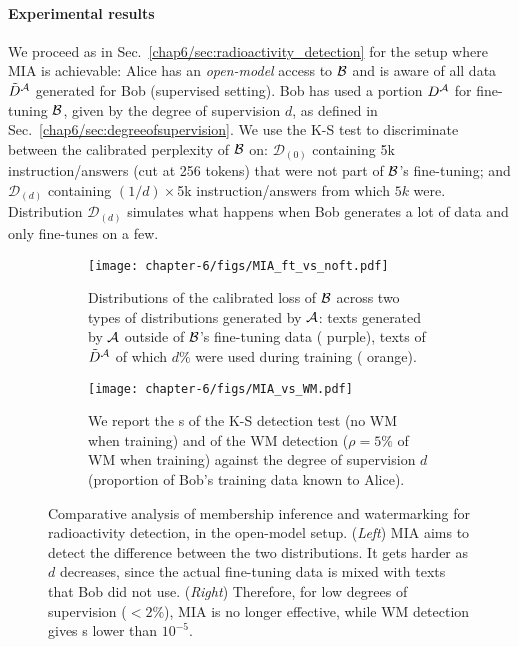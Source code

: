 \paragraph*{Experimental results}

We proceed as in Sec.~\ref{chap6/sec:radioactivity_detection} for the setup where MIA is achievable:
Alice has an \emph{open-model} access to $\mathcal B$ and is aware of all data $\Tilde{D}^\mathcal A$ generated for Bob (supervised setting). 
Bob has used a portion $D^\mathcal A$ for fine-tuning $\mathcal B$, given by the degree of supervision $d$, as defined in Sec.~\ref{chap6/sec:degreeofsupervision}.
We use the K-S test to discriminate between the calibrated perplexity of $\mathcal B$ on: $\mathcal D_{(0)}$ containing 5k instruction/answers (cut at 256 tokens) that were not part of $\mathcal B$'s fine-tuning; and $\mathcal D_{(d)}$ containing $(1/d)\times$5k instruction/answers from which $5k$ were.
Distribution $\mathcal D_{(d)}$ simulates what happens when Bob generates a lot of data and only fine-tunes on a few.


\begin{figure}[b!]
    \centering
    \begin{subfigure}[b]{0.45\textwidth}
        \centering
        \texttt{[image: chapter-6/figs/MIA\_ft\_vs\_noft.pdf]}
        \caption{
            Distributions of the calibrated loss of $\mathcal B$ across two types of distributions generated by $\mathcal A$: 
            texts generated by $\mathcal A$ outside of $\mathcal B$'s fine-tuning data ({\color{curve1} purple}), texts of $\Tilde{D}^{\mathcal A}$ of which $d\%$ were used during training ({\color{curve2} orange}).
        }
        \label{chap6/fig:calibrated-loss}
    \end{subfigure}\hfill
    \begin{subfigure}[b]{0.5\textwidth}
        \centering
        \texttt{[image: chapter-6/figs/MIA\_vs\_WM.pdf]}
        \caption{
            We report the \pval s of the {\color{curve1} K-S detection test} (no WM when training) and of the {\color{curve2} WM detection} ($\rho=5\%$ of WM when training) against the degree of supervision $d$ (proportion of Bob's training data known to Alice).
        }
        \label{chap6/fig:mia_vs_wm}
    \end{subfigure}
    \caption{
        Comparative analysis of membership inference and watermarking for radioactivity detection, in the open-model setup.
        (\emph{Left}) MIA aims to detect the difference between the two distributions. 
        It gets harder as $d$ decreases, since the actual fine-tuning data is mixed with texts that Bob did not use.
        (\emph{Right}) Therefore, for low degrees of supervision ($<2\%$), MIA is no longer effective, while WM detection gives \pval s lower than $10^{-5}$.
    }
    \label{chap6/fig:mia-comparative-analysis}
\end{figure}

